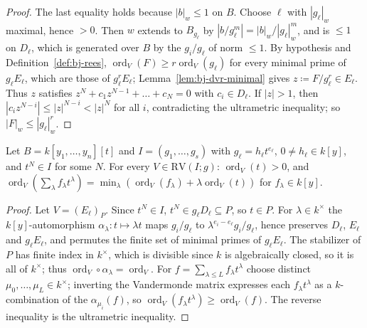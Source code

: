 \begin{proof}
The last equality holds because $|b|_w\le1$ on $B$. Choose $\ell$ with $|g_\ell|_w$ maximal, hence $>0$.
Then $w$ extends to $B_{g_\ell}$ by $|b/g_\ell^m|=|b|_w/|g_\ell|_w^m$, and is $\le1$ on $D_\ell$, which is
generated over $B$ by the $g_i/g_\ell$ of norm $\le1$. By hypothesis and Definition~\ref{def:bj-rees},
$\operatorname{ord}_V(F)\ge r\operatorname{ord}_V(g_\ell)$ for every minimal prime of $g_\ell E_\ell$, which are those of $g_\ell^rE_\ell$;
Lemma~\ref{lem:bj-dvr-minimal} gives $z\coloneqq F/g_\ell^r\in E_\ell$. Thus $z$ satisfies
$z^N+c_1z^{N-1}+\dots+c_N=0$ with $c_i\in D_\ell$. If $|z|>1$, then $|c_iz^{N-i}|\le|z|^{N-i}<|z|^N$ for
all $i$, contradicting the ultrametric inequality; so $|F|_w\le|g_\ell|_w^r$.
\end{proof}

\begin{lemma}\label{lem:bj-rees-invariant}
\leanok
{}
Let $B=k[y_1,\dots,y_n][t]$ and $I=(g_1,\dots,g_s)$ with $g_\ell=h_\ell t^{e_\ell}$, $0\ne h_\ell\in k[y]$, and
$t^N\in I$ for some $N$. For every $V\in\mathrm{RV}(I;g)$: $\operatorname{ord}_V(t)>0$, and
$\operatorname{ord}_V(\sum_\lambda f_\lambda t^\lambda)=\min_\lambda(\operatorname{ord}_V(f_\lambda)+\lambda\operatorname{ord}_V(t))$ for $f_\lambda\in k[y]$.
\end{lemma}

\begin{proof}
Let $V=(E_\ell)_P$. Since $t^N\in I$, $t^N\in g_\ell D_\ell\subseteq P$, so $t\in P$. For $\lambda\in k^\times$
the $k[y]$-automorphism $\alpha_\lambda\colon t\mapsto\lambda t$ maps $g_i/g_\ell$ to $\lambda^{e_i-e_\ell}g_i/g_\ell$,
hence preserves $D_\ell$, $E_\ell$ and $g_\ell E_\ell$, and permutes the finite set of minimal primes of
$g_\ell E_\ell$. The stabilizer of $P$ has finite index in $k^\times$, which is divisible since $k$ is
algebraically closed, so it is all of $k^\times$; thus $\operatorname{ord}_V\circ\alpha_\lambda=\operatorname{ord}_V$. For
$f=\sum_{\lambda\le L}f_\lambda t^\lambda$ choose distinct $\mu_0,\dots,\mu_L\in k^\times$; inverting the
Vandermonde matrix expresses each $f_\lambda t^\lambda$ as a $k$-combination of the $\alpha_{\mu_i}(f)$, so
$\operatorname{ord}_V(f_\lambda t^\lambda)\ge\operatorname{ord}_V(f)$. The reverse inequality is the ultrametric inequality.
\end{proof}

